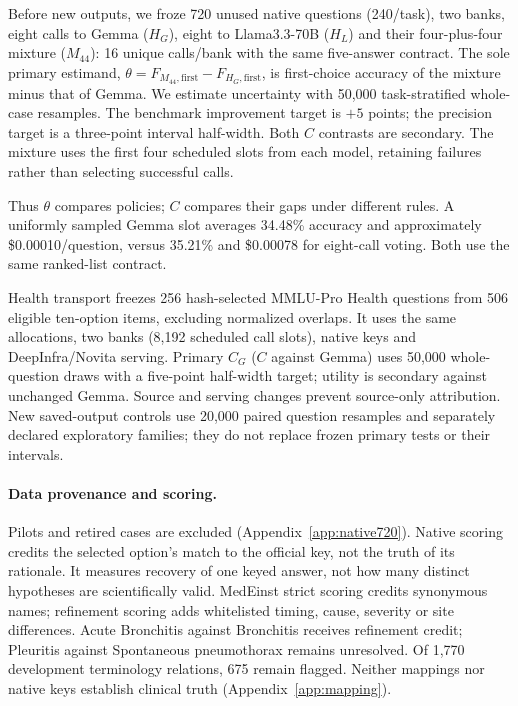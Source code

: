 \documentclass{article}
\begin{document}
Before new outputs, we froze 720 unused native questions (240/task), two banks, eight calls to Gemma ($H_G$), eight to Llama3.3-70B ($H_L$) and their four-plus-four mixture ($M_{44}$): 16 unique calls/bank with the same five-answer contract. The sole primary estimand, $\theta=F_{M_{44},\mathrm{first}}-F_{H_G,\mathrm{first}}$, is first-choice accuracy of the mixture minus that of Gemma. We estimate uncertainty with 50,000 task-stratified whole-case resamples. The benchmark improvement target is $+5$ points; the precision target is a three-point interval half-width. Both $C$ contrasts are secondary. The mixture uses the first four scheduled slots from each model, retaining failures rather than selecting successful calls.

Thus $\theta$ compares policies; $C$ compares their gaps under different rules. A uniformly sampled Gemma slot averages 34.48\% accuracy and approximately \$0.00010/question, versus 35.21\% and \$0.00078 for eight-call voting. Both use the same ranked-list contract.

Health transport freezes 256 hash-selected MMLU-Pro Health questions \citep{wang2024mmlupro} from 506 eligible ten-option items, excluding normalized overlaps. It uses the same allocations, two banks (8,192 scheduled call slots), native keys and DeepInfra/Novita serving. Primary $C_G$ ($C$ against Gemma) uses 50,000 whole-question draws with a five-point half-width target; utility is secondary against unchanged Gemma. Source and serving changes prevent source-only attribution. New saved-output controls use 20,000 paired question resamples and separately declared exploratory families; they do not replace frozen primary tests or their intervals.

\paragraph{Data provenance and scoring.}
Pilots and retired cases are excluded (Appendix~\ref{app:native720}). Native scoring credits the selected option's match to the official key, not the truth of its rationale. It measures recovery of one keyed answer, not how many distinct hypotheses are scientifically valid. MedEinst strict scoring credits synonymous names; refinement scoring adds whitelisted timing, cause, severity or site differences. Acute Bronchitis against Bronchitis receives refinement credit; Pleuritis against Spontaneous pneumothorax remains unresolved. Of 1,770 development terminology relations, 675 remain flagged. Neither mappings nor native keys establish clinical truth (Appendix~\ref{app:mapping}).
\end{document}
